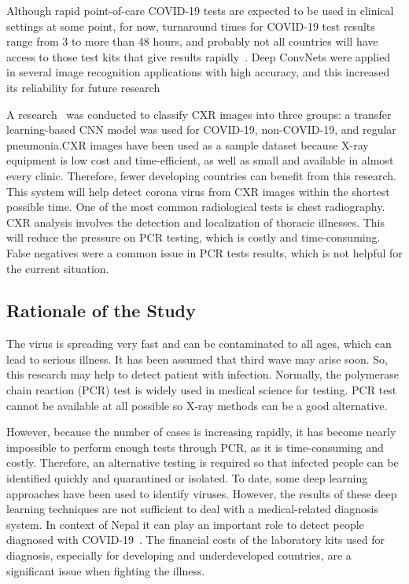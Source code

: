 Although rapid point-of-care COVID-19 tests are expected to be used in clinical settings at some point, for now, turnaround times for COVID-19 test results range from 3 to more than 48 hours, and probably not all countries will have access to those test kits that give results rapidly~\cite{ricxr}. Deep ConvNets were applied in several image recognition applications with high accuracy, and this increased its reliability for future research  

A research~\cite{Rubin2020} was conducted to classify CXR images into three groups: a transfer learning-based CNN model was used for COVID-19, non-COVID-19, and regular pneumonia.CXR images have been used as a sample dataset because X-ray equipment is low cost and time-efficient, as well as small and available in almost every clinic. Therefore, fewer developing countries can benefit from this research. This system will help detect corona virus from CXR images within the shortest possible time. One of the most common radiological tests is chest radiography. CXR analysis involves the detection and localization of thoracic illnesses. This will reduce the pressure on PCR testing, which is costly and time-consuming. False negatives were a common issue in PCR tests results, which is not helpful for the current situation. 

\subsection{Rationale of the Study}

The virus is spreading very fast and can be contaminated to all ages, which can lead to serious illness. It has been assumed that third wave may arise soon. So, this research may help to detect patient with infection. Normally, the polymerase chain reaction (PCR) test is widely used in medical science for testing. PCR test cannot be available at all possible so X-ray methods can be a good alternative. 

However, because the number of cases is increasing rapidly, it has become nearly impossible to perform enough tests through PCR, as it is time-consuming and costly. Therefore, an alternative testing is required so that infected people can be identified quickly and quarantined or isolated. To date, some deep learning approaches have been used to identify viruses. However, the results of these deep learning techniques are not sufficient to deal with a medical-related diagnosis system. In context of Nepal it can play an important role to detect people diagnosed with COVID-19~\cite{Rubin2020}. The financial costs of the laboratory kits used for diagnosis, especially for developing and underdeveloped countries, are a significant issue when fighting the illness.

